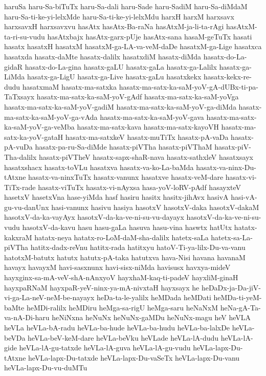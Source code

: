 {haruSa
haru-Sa-biTuTx
haru-Sa-dali
haru-Sade
haru-SadiM
haru-Sa-diMdaM
haru-Sa-ti-ke-yi-lelxMde
haru-Sa-ti-ke-yi-lelxMdu
harxH
harxM
harxsavx
harxsavxH
harxsavxvu
hasAtx
hasAtx-Ba-raNa
hasAtxM-ja-li-ta-rAgi
hasAtxM-ta-ri-su-vudu
hasAtxbajx
hasAtx-garx-pUje
hasAtx-sana
hasaM-geTuTx
hasati
hasatx
hasatxH
hasatxM
hasatxM-ga-LA-va-veM-daDe
hasatxM-ga-Lige
hasatxca
hasatxda
hasatx-daMte
hasatx-dalilx
hasatxdiM
hasatx-diMda
hasatx-do-La-gidaR
hasatx-do-La-gina
hasatx-gaLU
hasatx-gaLa
hasatx-ga-Lalilx
hasatx-ga-LiMda
hasatx-ga-LigU
hasatx-ga-Live
hasatx-gaLu
hasatxkekx
hasatx-kekx-re-dudu
hasatxmaM
hasatx-ma-satxka
hasatx-ma-satx-ka-saM-yoV-gA-dUBx-ti-pa-TaTxsayx
hasatx-ma-satx-ka-saM-yoV-gAdf
hasatx-ma-satx-ka-saM-yoVga
hasatx-ma-satx-ka-saM-yoV-gadiM
hasatx-ma-satx-ka-saM-yoV-ga-diMda
hasatx-ma-satx-ka-saM-yoV-ga-vAda
hasatx-ma-satx-ka-saM-yoV-gava
hasatx-ma-satx-ka-saM-yoV-ga-veMba
hasatx-ma-satx-kava
hasatx-ma-satx-kayoVH
hasatx-ma-satx-ka-yoV-gataH
hasatx-ma-satxkeV
hasatx-muTiTx
hasatx-pA-vaDa
hasatx-pA-vuDa
hasatx-pa-ru-Sa-diMde
hasatx-piVTha
hasatx-piVThaM
hasatx-piV-Tha-dalilx
hasatx-piVTheV
hasatx-sapx-shaR-nava
hasatx-sathxleV
hasatxsayx
hasatxshacx
hasatx-toVLu
hasatxva
hasatx-va-ko-La-baMda
hasatx-va-ninx-Du-tAtxne
hasatx-va-ninxTuTx
hasatx-vanunx
hasatxve
hasatx-veM-dare
hasatx-vi-TiTx-rade
hasatx-viTuTx
hasatx-vi-nAyxsa
hasa-yoV-loRV-pAdf
hasayxteV
hasetxV
hasetxVna
hase-yiMda
hasf
hasiru
hasitx
hasitx-jihAvx
hasivA
hasi-vA-gu-vu-danUnx
hasi-vanunx
hasivu
hasiya
hasotxV
hasotxV-daka
hasotxV-dakaM
hasotxV-da-ka-vayAyx
hasotxV-da-ka-ve-ni-su-vu-dayayx
hasotxV-da-ka-ve-ni-su-vudu
hasotxV-da-kavu
hasu
hasu-gaLa
hasuva
hasu-vina
haswtx
hatUtx
hatatx-kakxraM
hatatx-neya
hatatx-ro-LoM-daM-sha-dalilx
hatetx-saLa
hatetx-sa-La-piVTha
hatitx-dadx-reVnu
hatitx-rada
hatitxyu
hatoV-Ti-ya-lilx-Du-va-vanu
hatotxM-batutx
hatutx
hatutx-pA-taka
hatutxva
hava-Nisi
havana
havanaM
havayx
havayxM
havi-sasxnunx
havi-sisx-niMda
havisusx
havxya-mideV
hayxginx-sa-mA-veV-shA-nAnxyoV
hayxhaM-kaq-ti-padeV
hayxliM-ginaH
hayxpaRNaM
hayxpaR-yeV-ninx-ya-mA-nivxtaH
hayxsayx
he
heDaDx-ja-Da-jiV-vi-ga-La-neV-neM-be-nayayx
heDa-ta-le-yalilx
heMDada
heMDati
heMDa-ti-yeM-baMte
heMDi-ralilx
heMDiru
heMga-sa-rigU
heMga-saru
heNaNxM
heNa-gA-Ta-va-nA-Di-haru
heNiNxna
heNuNx
heNuNx-gaMDu
heNuNx-magu
heV
heVLA
heVLa
heVLa-bA-radu
heVLa-ba-hude
heVLa-ba-hudu
heVLa-ba-lalxDe
heVLa-beVDa
heVLa-beV-keM-dare
heVLa-beVku
heVLade
heVLa-lA-dudu
heVLa-lA-gide
heVLa-lA-gu-tatxde
heVLa-lA-guva
heVLa-lA-gu-vudu
heVLa-lapx-Du-tAtxne
heVLa-lapx-Du-tatxde
heVLa-lapx-Du-vaSeTx
heVLa-lapx-Du-vanu
heVLa-lapx-Du-vu-duMTu
}
